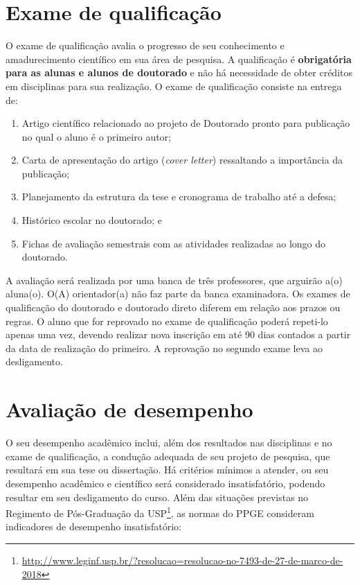 \documentclass[twoside a4paper 12pt]{report}
\begin{document}
\section{Exame de qualificação}
\label{sec:qualif}

O exame de qualificação avalia o progresso de seu conhecimento e amadurecimento científico em sua área de pesquisa. A qualificação é \textbf{obrigatória} \textbf{para as alunas e alunos de doutorado} e não há necessidade de obter créditos em disciplinas para sua realização. O exame de qualificação consiste na entrega de: 
\begin{enumerate}
\item Artigo científico relacionado ao projeto de Doutorado pronto para publicação no qual o aluno é o primeiro autor;
\item Carta de apresentação do artigo (\emph{cover letter}) ressaltando a importância da publicação; 
\item Planejamento da estrutura da tese e cronograma de trabalho até a defesa;
\item Histórico escolar no doutorado; e 
\item Fichas de avaliação semestrais com as atividades realizadas ao longo do doutorado.
\end{enumerate}

A avaliação será realizada por uma banca de três professores, que arguirão a(o) aluna(o). O(A) orientador(a) não faz parte da banca examinadora. Os exames de qualificação do doutorado e doutorado direto diferem em relação aos prazos ou regras. O aluno que for reprovado no exame de qualificação poderá repeti-lo apenas uma vez, devendo realizar nova inscrição em até 90 dias contados a partir da data de realização do primeiro. A reprovação no segundo exame leva ao desligamento.


\section{Avaliação de desempenho}
\label{sec:conduta}

O seu desempenho acadêmico inclui, além dos resultados nas disciplinas e no exame de qualificação, a condução adequada de seu projeto de pesquisa, que resultará em sua tese ou dissertação. Há critérios mínimos a atender, ou seu desempenho acadêmico e científico será considerado insatisfatório, podendo resultar em seu desligamento do curso. Além das situações previstas no  Regimento de Pós-Graduação da USP\footnote{\url{http://www.leginf.usp.br/?resolucao=resolucao-no-7493-de-27-de-marco-de-2018}}, as normas do PPGE consideram indicadores de desempenho insatisfatório:
\end{document}
